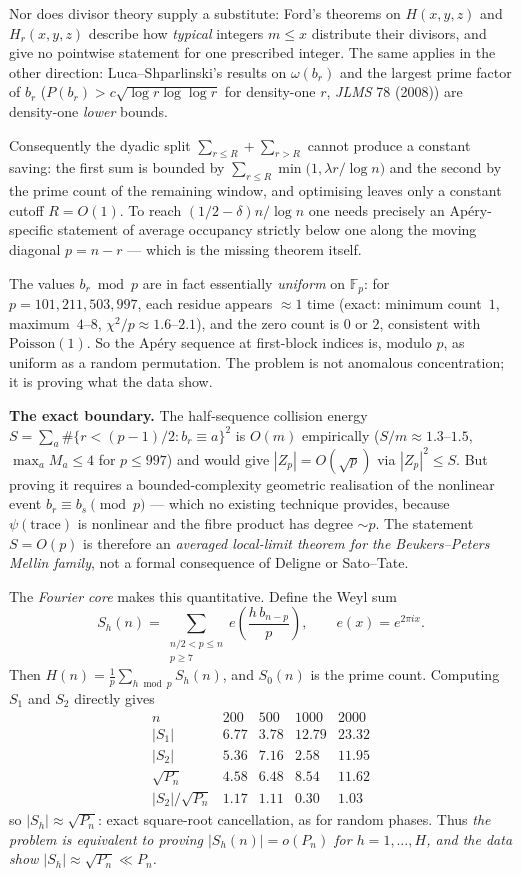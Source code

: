 Nor does divisor theory supply a substitute: Ford's theorems on $H(x,y,z)$ and $H_r(x,y,z)$
describe how \emph{typical} integers $m\le x$ distribute their divisors, and give no pointwise
statement for one prescribed integer.  The same applies in the other direction:
Luca--Shparlinski's results on $\omega(b_r)$ and the largest prime factor of $b_r$
($P(b_r)>c\sqrt{\log r\log\log r}$ for density-one $r$, \emph{JLMS} 78 (2008)) are
density-one \emph{lower} bounds.

Consequently the dyadic split $\sum_{r\le R}+\sum_{r>R}$ cannot produce a constant saving: the
first sum is bounded by $\sum_{r\le R}\min\bigl(1,\lambda r/\log n\bigr)$ and the second by the
prime count of the remaining window, and optimising leaves only a constant cutoff $R=O(1)$.  To
reach $(1/2-\delta)n/\log n$ one needs precisely an Ap\'ery-specific statement of average
occupancy strictly below one along the moving diagonal $p=n-r$ — which is the missing theorem
itself.

The values $b_r\bmod p$ are in fact essentially \emph{uniform} on $\mathbb F_p$: for $p=101,211,
503,997$, each residue appears $\approx1$ time (exact: minimum count~$1$, maximum~$4$--$8$,
$\chi^2/p\approx1.6$--$2.1$), and the zero count is $0$ or $2$, consistent with $\mathrm{Poisson}(1)$.
So the Ap\'ery sequence at first-block indices is, modulo $p$, as uniform as a random permutation.
The problem is not anomalous concentration; it is proving what the data show.

\medskip
\noindent\textbf{The exact boundary.}  The half-sequence collision energy
$S=\sum_a\#\{r<(p-1)/2:b_r\equiv a\}^2$ is $O(m)$ empirically ($S/m\approx1.3$--$1.5$,
$\max_aM_a\le4$ for $p\le997$) and would give $|Z_p|=O(\sqrt p)$ via $|Z_p|^2\le S$.  But
proving it requires a bounded-complexity geometric realisation of the nonlinear event
$b_r\equiv b_s\pmod p$ — which no existing technique provides, because $\psi(\text{trace})$ is
nonlinear and the fibre product has degree $\sim p$.  The statement $S=O(p)$ is therefore an
\emph{averaged local-limit theorem for the Beukers--Peters Mellin family}, not a formal
consequence of Deligne or Sato--Tate.

The \emph{Fourier core} makes this quantitative.  Define the Weyl sum
\[
  S_h(n)=\sum_{\substack{n/2<p\le n\\ p\ge7}}e\!\left(\frac{h\,b_{n-p}}p\right),
  \qquad e(x)=e^{2\pi ix}.
\]
Then $H(n)=\frac1p\sum_{h\bmod p}S_h(n)$, and $S_0(n)$ is the prime count.  Computing $S_1$ and
$S_2$ directly gives
\[
\begin{array}{c|cccc}
 n&200&500&1000&2000\\ \hline
 |S_1|&6.77&3.78&12.79&23.32\\
 |S_2|&5.36&7.16&2.58&11.95\\
 \sqrt{P_n}&4.58&6.48&8.54&11.62\\
 |S_2|/\sqrt{P_n}&1.17&1.11&0.30&1.03
\end{array}
\]
so $|S_h|\approx\sqrt{P_n}$: exact square-root cancellation, as for random phases.  Thus
\emph{the problem is equivalent to proving $|S_h(n)|=o(P_n)$ for $h=1,\ldots,H$, and the data
show $|S_h|\approx\sqrt{P_n}\ll P_n$.}

